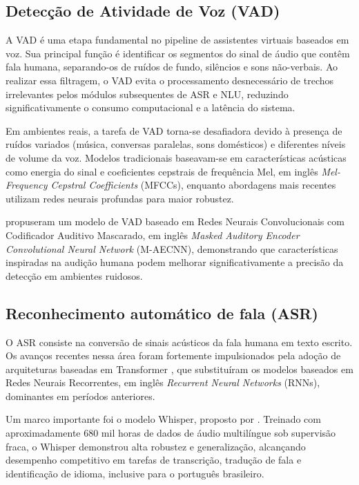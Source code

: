 \documentclass[
    12pt,                %
    openright,           %
    oneside,             %
    a4paper,             %
    english,             %
    brazil               %
]{abntex2}
\begin{document}
\subsection{Detecção de Atividade de Voz (VAD)}

A VAD é uma etapa fundamental no pipeline de assistentes virtuais baseados em voz. Sua principal função é identificar os segmentos do sinal de áudio que contêm fala humana, separando-os de ruídos de fundo, silêncios e sons não-verbais. Ao realizar essa filtragem, o VAD evita o processamento desnecessário de trechos irrelevantes pelos módulos subsequentes de ASR e NLU, reduzindo significativamente o consumo computacional e a latência do sistema.

Em ambientes reais, a tarefa de VAD torna-se desafiadora devido à presença de ruídos variados (música, conversas paralelas, sons domésticos) e diferentes níveis de volume da voz. Modelos tradicionais baseavam-se em características acústicas como energia do sinal e coeficientes cepstrais de frequência Mel, em inglês \textit{Mel-Frequency Cepstral Coefficients} (MFCCs), enquanto abordagens mais recentes utilizam redes neurais profundas para maior robustez.

\cite{Li2021} propuseram um modelo de VAD baseado em Redes Neurais Convolucionais com Codificador Auditivo Mascarado, em inglês \textit{Masked Auditory Encoder Convolutional Neural Network} (M-AECNN), demonstrando que características inspiradas na audição humana podem melhorar significativamente a precisão da detecção em ambientes ruidosos.

\subsection{Reconhecimento automático de fala (ASR)}

O ASR consiste na conversão de sinais acústicos da fala humana em texto escrito. Os avanços recentes nessa área foram fortemente impulsionados pela adoção de arquiteturas baseadas em Transformer \cite{Vaswani2017}, que substituíram os modelos baseados em Redes Neurais Recorrentes, em inglês \textit{Recurrent Neural Networks} (RNNs), dominantes em períodos anteriores.

Um marco importante foi o modelo Whisper, proposto por . Treinado com aproximadamente 680 mil horas de dados de áudio multilíngue sob supervisão fraca, o Whisper demonstrou alta robustez e generalização, alcançando desempenho competitivo em tarefas de transcrição, tradução de fala e identificação de idioma, inclusive para o português brasileiro.
\end{document}
